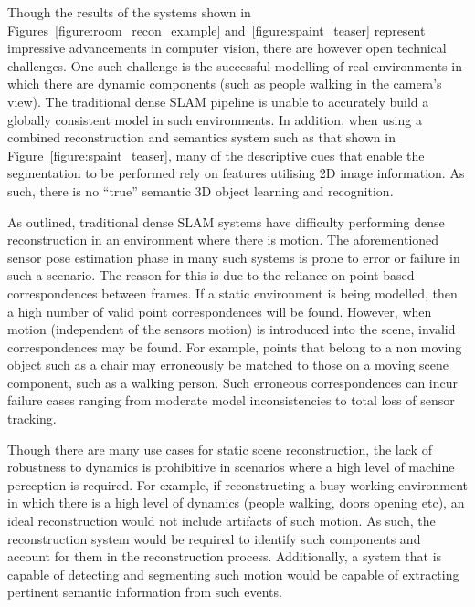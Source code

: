 Though the results of the systems shown in Figures~\ref{figure:room_recon_example} and~\ref{figure:spaint_teaser} 
represent impressive advancements in computer vision, there are however open technical challenges. One such 
challenge is the successful modelling of real environments in which there are dynamic components (such as 
people walking in the camera's view). The traditional dense SLAM pipeline is unable to accurately build a 
globally consistent model in such environments. In addition, when using a combined reconstruction and 
semantics system such as that shown in Figure~\ref{figure:spaint_teaser}, many of the descriptive cues that 
enable the segmentation to be performed rely on features utilising 2D image information. As such, there is 
no ``true'' semantic 3D object learning and recognition.

As outlined, traditional dense SLAM systems have difficulty performing dense reconstruction in an 
environment where there is motion. The aforementioned sensor pose estimation phase in many such systems
is prone to error or failure in such a scenario. The reason for this is due to the reliance on point based 
correspondences between frames. If a static environment is being modelled, then a high number of valid point 
correspondences will be found. However, when motion (independent of the sensors motion) is introduced into 
the scene, invalid correspondences may be found. For example, points that belong to a non moving object 
such as a chair may erroneously be matched to those on a moving scene component, such as a walking person.
Such erroneous correspondences can incur failure cases ranging from moderate model inconsistencies to total 
loss of sensor tracking.

Though there are many use cases for static scene reconstruction, the lack of robustness to dynamics is 
prohibitive in scenarios where a high level of machine perception is required. For example, if 
reconstructing a busy working environment in which there is a high level of dynamics (people walking, 
doors opening etc), an ideal reconstruction would not include artifacts of such motion. As such, the 
reconstruction system would be required to identify such components and account for them in the 
reconstruction process. Additionally, a system that is capable of detecting and segmenting such motion 
would be capable of extracting pertinent semantic information from such events.

